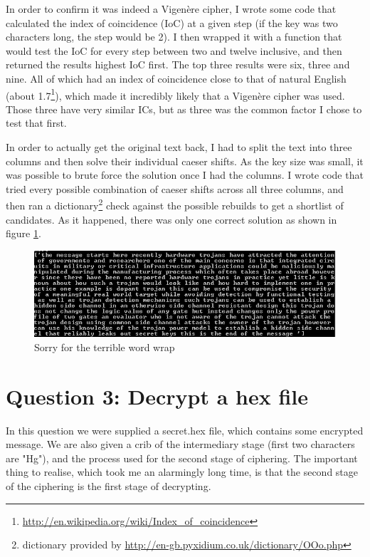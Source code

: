 \documentclass[12pt]{article}
\begin{document}
In order to confirm it was indeed a Vigen\`ere cipher, I wrote some code that calculated the index of coincidence (IoC) at a given step (if the key was two characters long, the step would be 2). I then wrapped it with a function that would test the IoC for every step between two and twelve inclusive, and then returned the results highest IoC first. The top three results were six, three and nine. All of which had an index of coincidence close to that of natural English (about 1.7\footnote{\url{http://en.wikipedia.org/wiki/Index_of_coincidence}}), which made it incredibly likely that a Vigen\`ere cipher was used. Those three have very similar ICs, but as three was the common factor I chose to test that first.

In order to actually get the original text back, I had to split the text into three columns and then solve their individual caeser shifts. As the key size was small, it was possible to brute force the solution once I had the columns. I wrote code that tried every possible combination of caeser shifts across all three columns, and then ran a dictionary\footnote{dictionary provided by \url{http://en-gb.pyxidium.co.uk/dictionary/OOo.php}} check against the possible rebuilds to get a shortlist of candidates. As it happened, there was only one correct solution as shown in figure \ref{fig:vigoutput}.

\begin{figure}[!h]
\label{fig:vigoutput}
\centering
\includegraphics[keepaspectratio=true]{qTwoOutput}
\caption{Sorry for the terrible word wrap}
\end{figure}

\section{Question 3: Decrypt a hex file}

In this question we were supplied a secret.hex file, which contains some encrypted message. We are also given a crib of the intermediary stage (first two characters are "Hg"), and the process used for the second stage of ciphering. The important thing to realise, which took me an alarmingly long time, is that the second stage of the ciphering is the first stage of decrypting.
\end{document}
